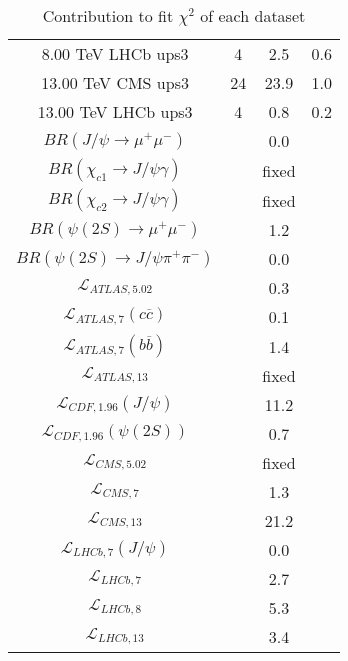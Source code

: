 \begin{table}[h!]
\begin{tabular}{c|c|c|c}
8.00 TeV LHCb ups3 & 4 & 2.5 & 0.6 \\
13.00 TeV CMS ups3 & 24 & 23.9 & 1.0 \\
13.00 TeV LHCb ups3 & 4 & 0.8 & 0.2 \\
\hline
$BR(J/\psi\rightarrow\mu^+\mu^-)$ &  & 0.0 &  \\
$BR(\chi_{c1}\rightarrow J/\psi\gamma)$ &  & fixed & \\
$BR(\chi_{c2}\rightarrow J/\psi\gamma)$ &  & fixed & \\
$BR(\psi(2S)\rightarrow\mu^+\mu^-)$ &  & 1.2 &  \\
$BR(\psi(2S)\rightarrow J/\psi\pi^+\pi^-)$ &  & 0.0 &  \\
$\mathcal L_{ATLAS,5.02}$ &  & 0.3 &  \\
$\mathcal L_{ATLAS,7}(c\overline c)$ &  & 0.1 &  \\
$\mathcal L_{ATLAS,7}(b\overline b)$ &  & 1.4 &  \\
$\mathcal L_{ATLAS,13}$ &  & fixed & \\
$\mathcal L_{CDF,1.96}(J/\psi)$ &  & 11.2 &  \\
$\mathcal L_{CDF,1.96}(\psi(2S))$ &  & 0.7 &  \\
$\mathcal L_{CMS,5.02}$ &  & fixed & \\
$\mathcal L_{CMS,7}$ &  & 1.3 &  \\
$\mathcal L_{CMS,13}$ &  & 21.2 &  \\
$\mathcal L_{LHCb,7}(J/\psi)$ &  & 0.0 &  \\
$\mathcal L_{LHCb,7}$ &  & 2.7 &  \\
$\mathcal L_{LHCb,8}$ &  & 5.3 &  \\
$\mathcal L_{LHCb,13}$ &  & 3.4 &  \\
\end{tabular}
\caption{Contribution to fit $\chi^2$ of each dataset}
\end{table}
